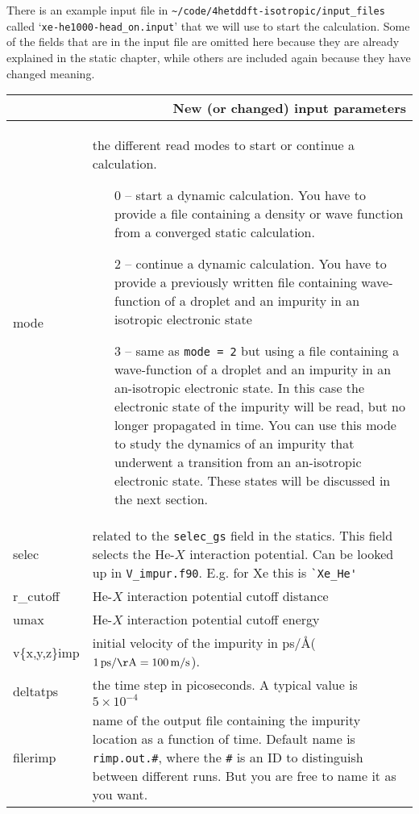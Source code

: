 \documentclass[10pt,a4paper]{article}
\begin{document}
	There is an example input file in \verb|~/code/4hetddft-isotropic/input_files| called `\verb|xe-he1000-head_on.input|' that we will use to start the calculation. Some of the fields that are in the input file are omitted here because they are already explained in the static chapter, while others are included again because they have changed meaning.
	\begin{center}
		\begin{tabular}{l|p{9.75cm}}
			\multicolumn{2}{r}{\textbf{New (or changed) input parameters}} \\
			\hline\hline	
			mode	& the different read modes to start or continue a calculation.
			\begin{enumerate}
			\item[0 --] start a dynamic calculation. You have to provide a file containing a density or wave function from a converged static calculation. 
			\item[2 --] continue a dynamic calculation. You have to provide a previously written file containing wave-function of a droplet and an impurity in an isotropic electronic state
			\item[3 --] same as \verb|mode = 2| but using a file containing a wave-function of a droplet and an impurity in an an-isotropic electronic state. In this case the electronic state of the impurity will be read, but no longer propagated in time. {\color{red}You can use this mode to study the dynamics of an impurity that underwent a transition from an an-isotropic electronic state. These states will be discussed in the next section.}
			\end{enumerate} \\
			selec	& related to the \verb|selec_gs| field in the statics. This field selects the He-$X$ interaction potential. Can be looked up in \verb|V_impur.f90|. E.g. for Xe this is \verb|`Xe_He'|\\
			r\_cutoff	& He-$X$ interaction potential  cutoff distance \\
			umax	& He-$X$ interaction potential  cutoff energy \\
			v\{x,y,z\}imp	& initial velocity of the impurity in ps/\AA \newline ($1\,\mathrm{ps/\AA}=100\,\mathrm{m/s}$). \\
			deltatps	& the time step in picoseconds. A typical value is $5\times 10^{-4}$ \\
			filerimp	& name of the output file containing the impurity location as a function of time. Default name is \verb|rimp.out.#|, where the \verb|#| is an ID to distinguish between different runs. But you are free to name it as you want. \\

\end{tabular}
\end{center}
\end{document}
